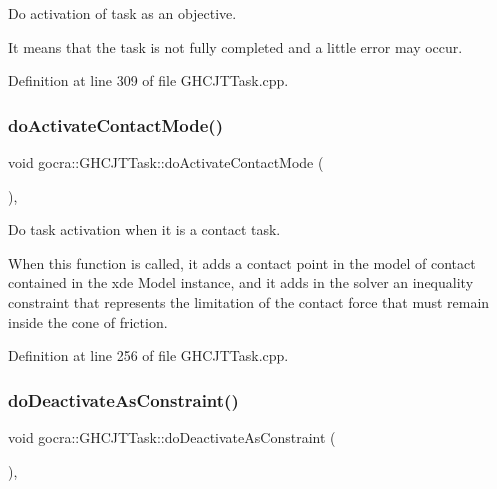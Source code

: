 Do activation of task as an objective.

It means that the task is not fully completed and a little error may occur. 

Definition at line 309 of file G\+H\+C\+J\+T\+Task.\+cpp.

\hypertarget{classgocra_1_1GHCJTTask_a22fe7a1bd0de44d7f51a250baf7796a8}{}\label{classgocra_1_1GHCJTTask_a22fe7a1bd0de44d7f51a250baf7796a8} 
\subsubsection{\texorpdfstring{do\+Activate\+Contact\+Mode()}{doActivateContactMode()}}
{\footnotesize\ttfamily void gocra\+::\+G\+H\+C\+J\+T\+Task\+::do\+Activate\+Contact\+Mode (\begin{DoxyParamCaption}{ }\end{DoxyParamCaption})\hspace{0.3cm}{\ttfamily [protected]}, {\ttfamily [virtual]}}

Do task activation when it is a contact task.

When this function is called, it adds a contact point in the model of contact contained in the xde Model instance, and it adds in the solver an inequality constraint that represents the limitation of the contact force that must remain inside the cone of friction. 

Definition at line 256 of file G\+H\+C\+J\+T\+Task.\+cpp.

\hypertarget{classgocra_1_1GHCJTTask_a2274fda92c62d88a6b4b35286606c41c}{}\label{classgocra_1_1GHCJTTask_a2274fda92c62d88a6b4b35286606c41c} 
\subsubsection{\texorpdfstring{do\+Deactivate\+As\+Constraint()}{doDeactivateAsConstraint()}}
{\footnotesize\ttfamily void gocra\+::\+G\+H\+C\+J\+T\+Task\+::do\+Deactivate\+As\+Constraint (\begin{DoxyParamCaption}{ }\end{DoxyParamCaption})\hspace{0.3cm}{\ttfamily [protected]}, {\ttfamily [virtual]}}

